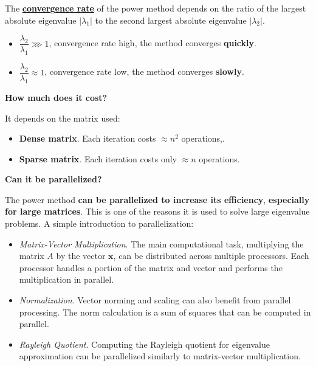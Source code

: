 \highspace
The \textbf{\underline{convergence rate}} of the power method depends on the ratio of the largest absolute eigenvalue $\left|\lambda_{1}\right|$ to the second largest absolute eigenvalue $\left|\lambda_{2}\right|$.
\begin{itemize}
    \item $\dfrac{\lambda_{2}}{\lambda_{1}} \ggg 1$, convergence rate high, the method converges \textbf{quickly}.
    \item $\dfrac{\lambda_{2}}{\lambda_{1}} \approx 1$, convergence rate low, the method converges \textbf{slowly}.
\end{itemize}

\highspace
\begin{flushleft}
    \textcolor{Red2}{ \textbf{How much does it cost?}}
\end{flushleft}
It depends on the matrix used:
\begin{itemize}
    \item \textbf{Dense matrix}. Each iteration costs $\approx n^{2}$ operations,.
    \item \textbf{Sparse matrix}. Each iteration costs only $\approx n$ operations.
\end{itemize}

\highspace
\begin{flushleft}
    \textcolor{Green3}{ \textbf{Can it be parallelized?}}
\end{flushleft}
The power method \textbf{can be parallelized to increase its efficiency}, \textbf{especially for large matrices}. This is one of the reasons it is used to solve large eigenvalue problems. A simple introduction to parallelization:
\begin{itemize}
    \item \emph{Matrix-Vector Multiplication}. The main computational task, multiplying the matrix $A$ by the vector $\mathbf{x}$, can be distributed across multiple processors. Each processor handles a portion of the matrix and vector and performs the multiplication in parallel.

    \item \emph{Normalization}. Vector norming and scaling can also benefit from parallel processing. The norm calculation is a sum of squares that can be computed in parallel.
    
    \item \emph{Rayleigh Quotient}. Computing the Rayleigh quotient for eigenvalue approximation can be parallelized similarly to matrix-vector multiplication.
\end{itemize}
